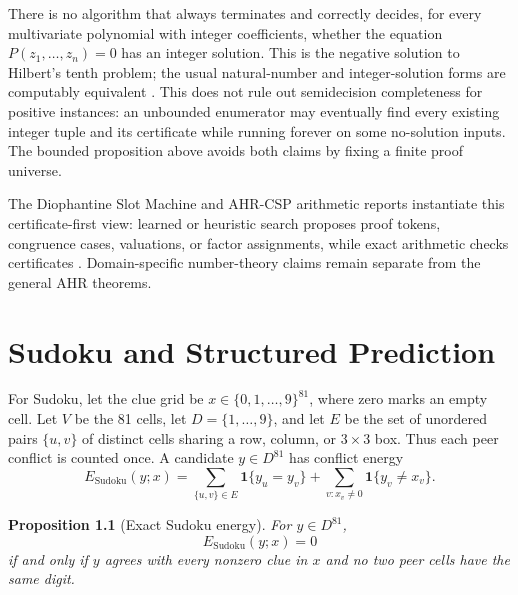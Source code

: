 \documentclass[11pt,oneside]{book}
\newtheorem{proposition}[definition]{Proposition}
\theoremstyle{remark}
\newcommand{\one}{\mathbf 1}
\begin{document}
There is no algorithm that always terminates and correctly decides, for every
multivariate polynomial with integer coefficients, whether the equation
$P(z_1,\ldots,z_n)=0$ has an integer solution. This is the negative solution
to Hilbert's tenth problem; the usual natural-number and integer-solution
forms are computably equivalent \cite{Matiyasevich1993}. This does not rule
out semidecision completeness for positive instances: an unbounded
enumerator may eventually find every existing integer tuple and its
certificate while running forever on some no-solution inputs. The bounded
proposition above avoids both claims by fixing a finite proof universe.

The Diophantine Slot Machine and AHR-CSP arithmetic reports instantiate this certificate-first view: learned or heuristic search proposes proof tokens, congruence cases, valuations, or factor assignments, while exact arithmetic checks certificates \cite{FalkenburgDSM2025,FalkenburgBrocardAHR2026,FalkenburgBrocardCases2026}. Domain-specific number-theory claims remain separate from the general AHR theorems.

\chapter{Sudoku and Structured Prediction}

For Sudoku, let the clue grid be $x\in\{0,1,\ldots,9\}^{81}$, where zero
marks an empty cell. Let $V$ be the 81 cells, let
$D=\{1,\ldots,9\}$, and let $E$ be the set
of unordered pairs $\{u,v\}$ of distinct cells sharing a row, column, or
$3\times3$ box. Thus each peer conflict is counted once. A candidate
$y\in D^{81}$ has conflict energy
\[
E_{\mathrm{Sudoku}}(y;x)=
\sum_{\{u,v\}\in E}\one\{y_u=y_v\}
+\sum_{v:x_v\ne0}\one\{y_v\ne x_v\}.
\]

\begin{proposition}[Exact Sudoku energy]
For $y\in D^{81}$,
\[
E_{\mathrm{Sudoku}}(y;x)=0
\]
if and only if $y$ agrees with every nonzero clue in $x$ and no two peer
cells have the same digit.
\end{proposition}
\end{document}
